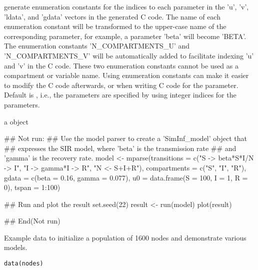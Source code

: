 \documentclass[letterpaper]{book}
\begin{document}
\begin{Arguments}
\begin{ldescription}
\item[\code{use\_enum}] generate enumeration constants for the indices to
each parameter in the 'u', 'v', 'ldata', and 'gdata' vectors
in the generated C code. The name of each enumeration constant
will be transformed to the upper-case name of the
corresponding parameter, for example, a parameter 'beta' will
become 'BETA'. The enumeration constants 'N\_COMPARTMENTS\_U'
and 'N\_COMPARTMENTS\_V' will be automatically added to
facilitate indexing 'u' and 'v' in the C code. These two
enumeration constants cannot be used as a compartment or
variable name. Using enumeration constants can make it easier
to modify the C code afterwards, or when writing C code for
the  parameter. Default is , i.e.,
the parameters are specified by using integer indices for the
parameters.
\end{ldescription}
\end{Arguments}
%
\begin{Value}
a  object
\end{Value}
%
\begin{Examples}
\begin{ExampleCode}
## Not run: 
## Use the model parser to create a 'SimInf_model' object that
## expresses the SIR model, where 'beta' is the transmission rate
## and 'gamma' is the recovery rate.
model  <- mparse(transitions = c("S -> beta*S*I/N -> I",
                                 "I -> gamma*I -> R",
                                 "N <- S+I+R"),
                 compartments = c("S", "I", "R"),
                 gdata = c(beta = 0.16, gamma = 0.077),
                 u0 = data.frame(S = 100, I = 1, R = 0),
                 tspan = 1:100)

## Run and plot the result
set.seed(22)
result <- run(model)
plot(result)

## End(Not run)
\end{ExampleCode}
\end{Examples}
%
\begin{Description}
Example data to initialize a population of 1600 nodes and
demonstrate various models.
\end{Description}
%
\begin{Usage}
\begin{verbatim}
data(nodes)
\end{verbatim}
\end{Usage}
\end{document}
